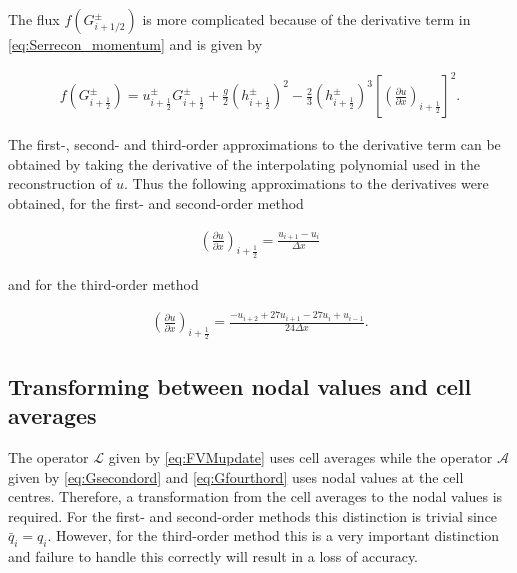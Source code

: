 \documentclass[SingleSpace,12pt,Proceedings]{Serre_ASCE}
\begin{document}
The flux $f(G^\pm_{i + 1/2})$ is more complicated because of the derivative term in \eqref{eq:Serrecon_momentum}  and is given by
\begin{linenomath*}
\begin{gather*} %
f\left(G^\pm_{i + \frac{1}{2}}\right)= u^\pm_{i + \frac{1}{2}} G^\pm_{i + \frac{1}{2}} + \frac{g}{2} \left(h^\pm_{i + \frac{1}{2}} \right)^2 - \frac{2}{3} \left(h^\pm_{i + \frac{1}{2}} \right)^3 \left[\left(\frac{\partial u}{\partial x}\right)_{i + \frac{1}{2}}\right]^2.
\end{gather*}
\end{linenomath*}
The first-, second- and third-order approximations to the derivative term can be obtained by taking the derivative of the interpolating polynomial used in the reconstruction of $u$. Thus the following approximations to the derivatives were obtained, for the first- and second-order method
\begin{linenomath*}
\begin{gather*} %
\left(\frac{\partial u}{\partial x}\right)_{i + \frac{1}{2}} = \frac{ u_{i + 1} - u_{i}}{\Delta x}
\end{gather*}
\end{linenomath*}
and for the third-order method
\begin{linenomath*}
\begin{gather*} %
\left(\frac{\partial u}{\partial x}\right)_{i + \frac{1}{2}} = \frac{ -u_{i + 2} + 27u_{i +1}  -27 u_{i} + u_{i-1}  }{24\Delta x} .
\end{gather*}
\end{linenomath*}
\subsection{Transforming between nodal values and cell averages} %
The operator $\mathcal{L}$ given by \eqref{eq:FVMupdate} uses cell averages while the operator $\mathcal{A}$ given by \eqref{eq:Gsecondord} and \eqref{eq:Gfourthord} uses nodal values at the cell centres. Therefore, a transformation from the cell averages to the nodal values is required. For the first- and second-order methods this distinction is trivial since $\bar{q}_i = q_i$. However, for the third-order method this is a very important distinction and failure to handle this correctly will result in a loss of accuracy. 
\end{document}
